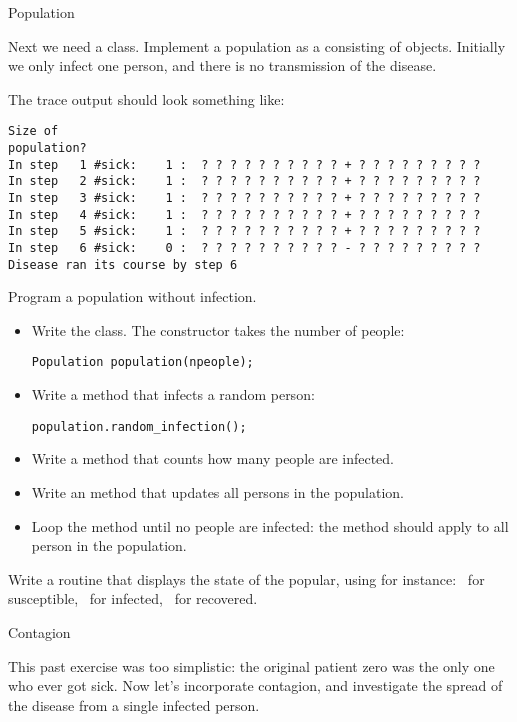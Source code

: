  {Population}

\prerequisite{\ref{ch:array}}

Next we need a  class. Implement a population as a 
consisting of  objects. Initially we only infect one person, and there
is no transmission of the disease.

The trace output should look something like:
\begin{verbatim}
Size of
population?
In step   1 #sick:    1 :  ? ? ? ? ? ? ? ? ? ? + ? ? ? ? ? ? ? ? ?
In step   2 #sick:    1 :  ? ? ? ? ? ? ? ? ? ? + ? ? ? ? ? ? ? ? ?
In step   3 #sick:    1 :  ? ? ? ? ? ? ? ? ? ? + ? ? ? ? ? ? ? ? ?
In step   4 #sick:    1 :  ? ? ? ? ? ? ? ? ? ? + ? ? ? ? ? ? ? ? ?
In step   5 #sick:    1 :  ? ? ? ? ? ? ? ? ? ? + ? ? ? ? ? ? ? ? ?
In step   6 #sick:    0 :  ? ? ? ? ? ? ? ? ? ? - ? ? ? ? ? ? ? ? ?
Disease ran its course by step 6
\end{verbatim}

\begin{exercise}
  \label{ex:infect:notransfer}
  Program a population without infection.
  \begin{itemize}
  \item Write the  class. The constructor takes the number of people:
\begin{verbatim}
Population population(npeople);  
\end{verbatim}
  \item Write a method that infects a random person:
\begin{verbatim}
population.random_infection();
\end{verbatim}
  \item Write a method  that counts how many people are infected.
  \item Write an  method that updates all persons in the population.
  \item Loop the  method until no people are infected: the
     method should apply  to
    all person in the population.
  \end{itemize}
\item Write a routine that displays the state of the popular, using
  for instance: ~for susceptible, \n{+}~for infected, \n{-}~for recovered.
\end{exercise}

 {Contagion}

This past exercise was too simplistic: the original patient zero was
the only one who ever got sick.
Now let's incorporate contagion, and investigate the spread of the disease
from a single infected person.

